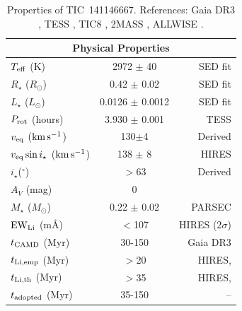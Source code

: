 \documentclass{nature3}
\newcommand{\kms}{\ensuremath{\rm km\,s^{-1}}}
\begin{document}
\begin{methods}
\begin{table}
\begin{tabular}{lcr}
    \hline
    \multicolumn{3}{c}{Physical Properties} \\
    \hline
    $T_{\rm eff}$ (K) & 2972 $\pm$ 40 & SED fit \cite{Bouma2024} \\
    $R_\star$ ($R_{\odot}$) & 0.42 $\pm$ 0.02 & SED fit \cite{Bouma2024} \\
    $L_\star$ ($L_\odot$) & 0.0126 $\pm$ 0.0012 & SED fit \cite{Bouma2024} \\
    $P_{\rm rot}$ (hours) & 3.930 $\pm$ 0.001 & TESS \\ 
    $v_{\rm eq}$ (\kms)  &  130$\pm$4  & Derived \\
    $v_{\rm eq} \sin i_\star$ (\kms) & 138 $\pm$ 8 & HIRES \\
    $i_\star$($^\circ$) & $>$63 & Derived \\
    $A_V$ (mag) & 0 & \cite{Green2019} \\
    $M_\star$ ($M_{\odot}$)  & 0.22 $\pm$ 0.02  & PARSEC \cite{Chen2014}\\
    ${\rm EW}_{\rm Li}$ (m\AA) & $<$107 & HIRES (2$\sigma$)\\
    $t_{\rm CAMD}$ (Myr) & 30-150 &  Gaia DR3 \\
    $t_{\rm Li,emp}$ (Myr) & $>$20 &  HIRES, \cite{Jeffries2023} \\
    $t_{\rm Li,th}$ (Myr) & $>$35 &  HIRES, \cite{Feiden2016} \\
    $t_{\rm adopted}$ (Myr) & 35-150 &  -- \\
    \hline
    \end{tabular}
		\caption{Properties of TIC~141146667.  References:
    Gaia DR3 \cite{GaiaDR3}, TESS \cite{Ricker2015},
    TIC8 \cite{Stassun2019}, 2MASS \cite{Skrutskie2006}, ALLWISE
    \cite{Cutri2014}.}
    \label{tab:stparams}
\end{table}



\end{methods}
\end{document}
